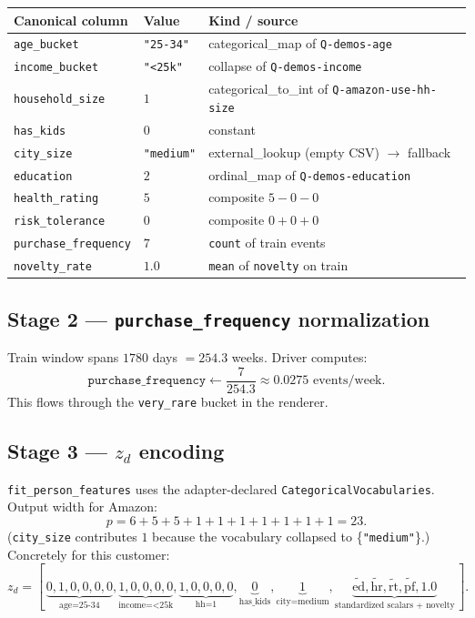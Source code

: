 \documentclass[11pt,a4paper]{article}
\begin{document}
\begin{center}
\small
\begin{tabular}{@{}l l l@{}}
\toprule
Canonical column & Value & Kind / source \\
\midrule
\texttt{age\_bucket}          & \texttt{"25-34"} & categorical\_map of \texttt{Q-demos-age} \\
\texttt{income\_bucket}       & \texttt{"<25k"}  & collapse of \texttt{Q-demos-income} \\
\texttt{household\_size}      & $1$              & categorical\_to\_int of \texttt{Q-amazon-use-hh-size} \\
\texttt{has\_kids}            & $0$              & constant \\
\texttt{city\_size}           & \texttt{"medium"} & external\_lookup (empty CSV) $\to$ fallback \\
\texttt{education}            & $2$              & ordinal\_map of \texttt{Q-demos-education} \\
\texttt{health\_rating}       & $5$              & composite $5 - 0 - 0$ \\
\texttt{risk\_tolerance}      & $0$              & composite $0 + 0 + 0$ \\
\texttt{purchase\_frequency}  & $7$              & \texttt{count} of train events \\
\texttt{novelty\_rate}        & $1.0$            & \texttt{mean} of \texttt{novelty} on train \\
\bottomrule
\end{tabular}
\end{center}

\subsection{Stage 2 — \texttt{purchase\_frequency} normalization}

Train window spans $1780$ days $= 254.3$ weeks.
Driver computes:
\[
\texttt{purchase\_frequency} \gets \frac{7}{254.3} \approx 0.0275 \text{ events/week}.
\]
This flows through the \texttt{very\_rare} bucket in the renderer.

\subsection{Stage 3 — $z_d$ encoding}

\texttt{fit\_person\_features} uses the adapter-declared
\texttt{CategoricalVocabularies}. Output width for Amazon:
\[
p = 6 + 5 + 5 + 1 + 1 + 1 + 1 + 1 + 1 + 1 = 23.
\]
(\texttt{city\_size} contributes $1$ because the vocabulary collapsed
to \{\texttt{"medium"}\}.) Concretely for this customer:
\[
z_d = [\,
\underbrace{0, 1, 0, 0, 0, 0}_{\text{age=25-34}},
\underbrace{1, 0, 0, 0, 0}_{\text{income=<25k}},
\underbrace{1, 0, 0, 0, 0}_{\text{hh=1}},
\underbrace{0}_{\text{has\_kids}},
\underbrace{1}_{\text{city=medium}},
\underbrace{\tilde{\mathrm{ed}}, \tilde{\mathrm{hr}}, \tilde{\mathrm{rt}}, \tilde{\mathrm{pf}}, 1.0}_{\text{standardized scalars + novelty}}
\,].
\]
\end{document}
